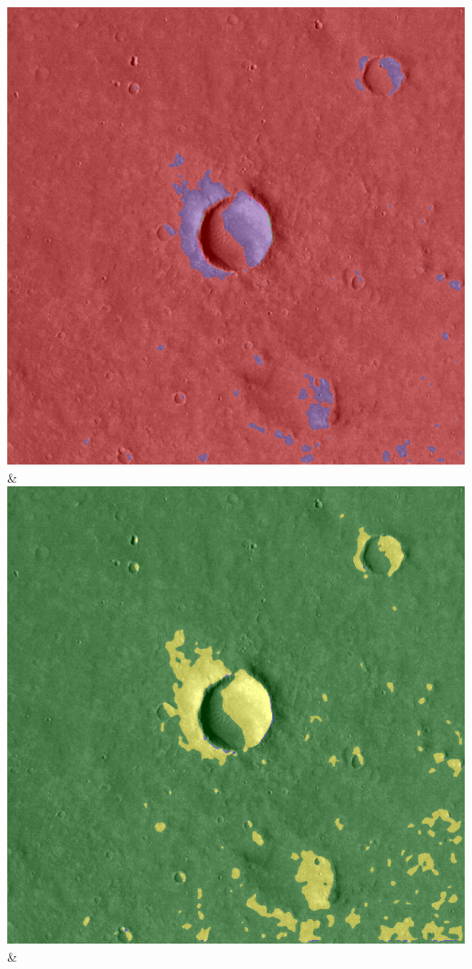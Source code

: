 \begin{table}[h!]
\begin{tabularx}{\textwidth}
		\includegraphics[width=0.9\linewidth]{images/gen/number_of_segments/p03_01.png_50.png} &
		\includegraphics[width=0.9\linewidth]{images/gen/number_of_segments/p03_01.png_75.png} &

\end{tabularx}
\end{table}
